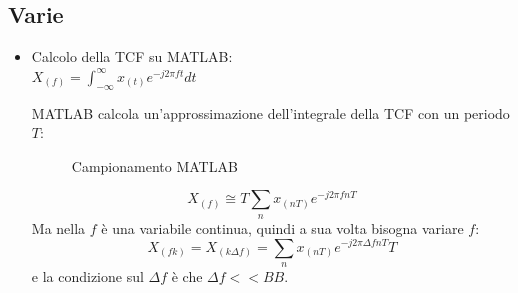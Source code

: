     \subsection{Varie}\label{Varie}
        \begin{itemize}
            \item {
                Calcolo della TCF su MATLAB:\\
                $X_{(f)} = \int_{-\infty}^{\infty} x_{(t)} e^{-j2\pi ft } dt$

                MATLAB calcola un'approssimazione dell'integrale della TCF con un periodo $T$:
                \begin{figure}[H]
                    \centering
                    \caption{Campionamento MATLAB}
                    \label{fig:campionamento MATLAB xt}
                \end{figure}    
                \[
                    X_{(f)} \cong  T\sum_{n} x_{(nT)}e^{-j2\pi fnT}
                \]
                Ma nella $f$ è una variabile continua, quindi a sua volta bisogna variare $f$:\\
                \[X_{(fk)} =X_{(k\Delta f)} = \sum_{n} x_{(nT)}e^{-j2\pi \Delta fnT}T\]
                e la condizione sul $\Delta f$ è che $\Delta f<<BB$.
                \begin{figure}[H]
                    \centering
                    \begin{tikzpicture}

\end{tikzpicture}
\end{figure}}
\end{itemize}
